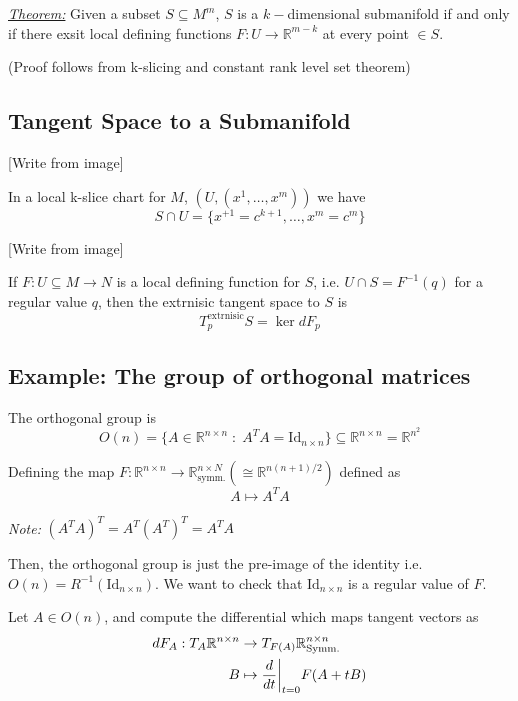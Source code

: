\documentclass{article}
\newcommand{\R}{\mathbb{R}}
\newcommand{\restr}[2]{{%
  \left.\kern-\nulldelimiterspace %
  #1 %
  \vphantom{\big|} %
  \right|_{#2} %
  }}
\begin{document}
\vskip 0.5cm
\begin{dottedbox}
  \underline{\emph{Theorem:}} Given a subset $S \subseteq M^m$, $S$ is a $k-$dimensional submanifold if and only if there exsit local defining functions $F : U \rightarrow \R^{m-k}$ at every point $\in S$.

  \vskip 0.5cm
  (Proof follows from k-slicing and constant rank level set theorem)
\end{dottedbox}

\vskip 1cm
\subsection{Tangent Space to a Submanifold}
[Write from image]

\vskip 0.5cm
In a local k-slice chart for $M$, $\left( U, \left( x^1, \dots, x^m \right) \right) $ we have 
\[ S \cap U = \{x^{+1} = c^{k+1}, \dots, x^m = c^{m}\} \]

[Write from image]

\vskip 0.5cm
If $F : U \subseteq M \rightarrow N$ is a local defining function for $S$, i.e. $U \cap S = F^{-1}(q)$ for a regular value $q$, then the extrnisic tangent space to $S$ is 
\[ T_{p}^{\text{extrnisic}} S = \ker dF_p \]

\vskip 1cm
\subsection*{Example: The group of orthogonal matrices}

\vskip 0.5cm
The orthogonal group is 
\[ O(n) = \{ A \in \R^{n \times n} \;:\; A^{T} A = \text{Id}_{n \times n} \} \subseteq \R^{n \times n} = \R^{{n^2}} \]

Defining the map $F : \R^{n \times n} \rightarrow \R^{n \times N}_{\text{symm.}} \left(\cong \R^{n(n+1)/2}\right)$ defined as 
\[ A \mapsto A^T A \]

\begin{dottedbox}
  \emph{Note:} $\left(A^T A\right)^T = A^T \left(A^T\right)^T = A^T A$
\end{dottedbox}

\vskip 0.5cm
Then, the orthogonal group is just the pre-image of the identity i.e. $O(n) = R^{-1}\left(\text{Id}_{n \times n}\right)$. We want to check that $\text{Id}_{n \times n}$ is a regular value of $F$.

\vskip 0.5cm
Let $A \in O(n)$, and compute the differential which maps tangent vectors as
\begin{align*}
  dF_{A} : T_A \R^{n \times n} &\rightarrow T_{F(A)} \R^{n \times n}_{\text{Symm.}} \\
  B &\mapsto \restr{\frac{d}{dt}}{t = 0} F(A + tB)
\end{align*}
\end{document}
